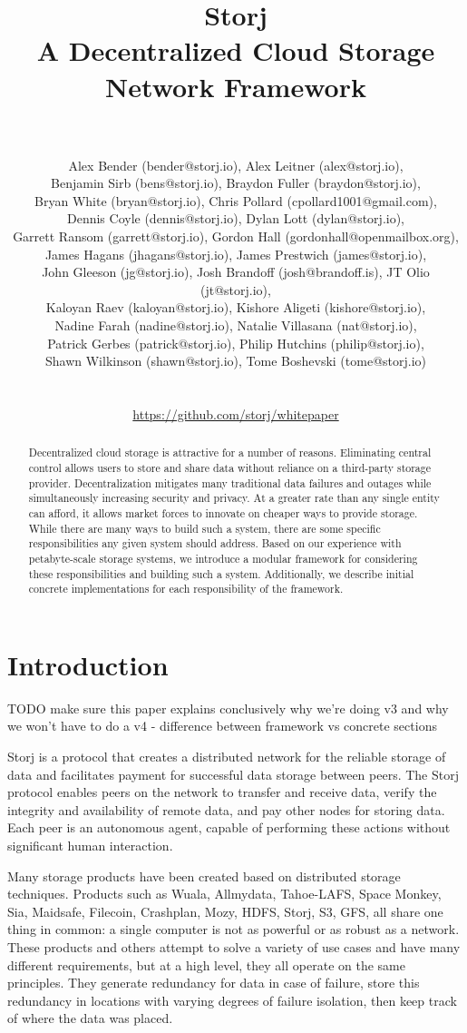 \documentclass[a4paper,10pt]{article} \usepackage[utf8]{inputenc}
\title{\textbf{Storj\\A Decentralized Cloud Storage Network Framework}}
\author{\\ \parbox{\linewidth}{\centering\small Alex Bender (bender@storj.io),
Alex Leitner (alex@storj.io),\\ Benjamin Sirb (bens@storj.io), Braydon Fuller
(braydon@storj.io),\\ Bryan White (bryan@storj.io), Chris Pollard
(cpollard1001@gmail.com),\\ Dennis Coyle (dennis@storj.io), Dylan Lott
(dylan@storj.io),\\ Garrett Ransom (garrett@storj.io), Gordon Hall
(gordonhall@openmailbox.org),\\ James Hagans (jhagans@storj.io), James Prestwich
(james@storj.io),\\ John Gleeson (jg@storj.io), Josh Brandoff
(josh@brandoff.is), JT Olio (jt@storj.io),\\ Kaloyan Raev (kaloyan@storj.io),
Kishore Aligeti (kishore@storj.io),\\ Nadine Farah (nadine@storj.io), Natalie
Villasana (nat@storj.io),\\ Patrick Gerbes (patrick@storj.io), Philip Hutchins
(philip@storj.io),\\ Shawn Wilkinson (shawn@storj.io), Tome Boshevski
(tome@storj.io)}\\ \\ \small \url{https://github.com/storj/whitepaper} } \date
\newcommand{\todo}[1]{{\color{red} TODO #1 }}
\begin{document}
 \maketitle

\begin{abstract} Decentralized cloud storage is attractive for a number of
reasons. Eliminating central control allows users to store and share data
without reliance on a third-party storage provider. Decentralization mitigates
many traditional data failures and outages while simultaneously increasing
security and privacy. At a greater rate than any single entity can afford, it allows
market forces to innovate on cheaper ways to provide storage. While there
are many ways to build such a system, there are some specific responsibilities
any given system should address. Based on our experience with petabyte-scale
storage systems, we introduce a modular framework for considering these
responsibilities and building such a system. Additionally, we describe initial concrete
implementations for each responsibility of the framework. \end{abstract}

\section{Introduction}

\todo{make sure this paper explains conclusively why we're doing v3 and why
we won't have to do a v4 - difference between framework vs concrete sections}

Storj is a protocol that creates a distributed network for the reliable storage
of data and facilitates payment for successful data storage between peers. The
Storj protocol enables peers on the network to transfer and receive data, verify the
integrity and availability of remote data, and pay other nodes
for storing data. Each peer is an autonomous agent, capable of performing these
actions without significant human interaction.

Many storage products have been created based on distributed storage techniques.
Products such as Wuala, Allmydata, Tahoe-LAFS, Space Monkey, Sia, Maidsafe,
Filecoin, Crashplan, Mozy, HDFS, Storj, S3, GFS, all share one thing in common:
a single computer is not as powerful or as robust as a network. These products
and others attempt to solve a variety of use cases and have many different
requirements, but at a high level, they all operate on the same principles. They
generate redundancy for data in case of failure, store this redundancy in
locations with varying degrees of failure isolation, then keep track of where
the data was placed.
\end{document}
